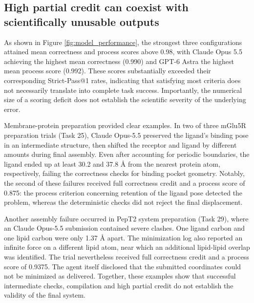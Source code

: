 \documentclass[twoside,twocolumn,9pt]{article}
\begin{document}
\subsection{High partial credit can coexist with scientifically unusable outputs}


As shown in Figure \ref{fig:model_performance}, the strongest three configurations attained mean correctness and process scores above 0.98, with Claude Opus 5.5 achieving the highest mean correctness (0.990) and GPT-6 Astra the highest mean process score (0.992). These scores substantially exceeded their corresponding Strict-Pass@1 rates, indicating that satisfying most criteria does not necessarily translate into complete task success. Importantly, the numerical size of a scoring deficit does not establish the scientific severity of the underlying error. 

Membrane-protein preparation provided clear examples. In two of three mGlu5R preparation trials (Task 25), Claude Opus-5.5 preserved the ligand’s binding pose in an intermediate structure, then shifted the receptor and ligand by different amounts during final assembly. Even after accounting for periodic boundaries, the ligand ended up at least 30.2 and 37.8 Å from the nearest protein atom, respectively, failing the correctness checks for binding pocket geometry. Notably, the second of these failures received full correctness credit and a process score of 0.875: the process criterion concerning retention of the ligand pose detected the problem, whereas the deterministic checks did not reject the final displacement.

Another assembly failure occurred in PepT2 system preparation (Task 29), where an Claude Opus-5.5 submission contained severe clashes. One ligand carbon and one lipid carbon were only 1.37 Å apart. The minimization log also reported an infinite force on a different lipid atom, near which an additional lipid-lipid overlap was identified. The trial nevertheless received full correctness credit and a process score of 0.9375. The agent itself disclosed that the submitted coordinates could not be minimized as delivered. Together, these examples show that successful intermediate checks, compilation and high partial credit do not establish the validity of the final system. 
\end{document}

